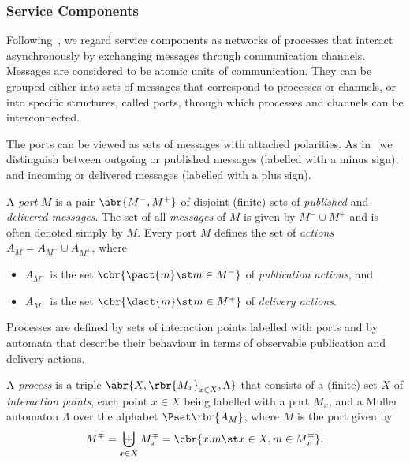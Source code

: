 \documentclass{LMCS}
\begin{document}
\subsubsection*{Service Components}

Following~\cite{Fiadeiro-Lopes:An-interface-theory-for-service-oriented-design-2013}, we regard service components as networks of processes that interact asynchronously by exchanging messages through communication channels.
Messages are considered to be atomic units of communication.  They can be grouped either into sets of messages that correspond to processes or channels, or into specific structures, called ports, through which processes and channels can be interconnected.

The ports can be viewed as sets of messages with attached polarities.  As in~\cite{Brand-Zafiropulo:Communicating-finite-state-machines-1983,Benatallah-Casati-Toumani:Representing-analysing-and-managing-Web-service-protocols-2006} we distinguish between outgoing or published messages (labelled with a minus sign), and incoming or delivered messages (labelled with a plus sign).

\begin{defi}[Port]
  A \emph{port} \(M\) is a pair \(\abr{M^{-}, M^{+}}\) of disjoint (finite) sets of \emph{published} and \emph{delivered messages}.
  The set of all \emph{messages} of \(M\) is given by \(M^{-} \cup M^{+}\) and is often denoted simply by \(M\).
  Every port \(M\) defines the set of \emph{actions} \(A_{M} = A_{M^{-}} \cup A_{M^{+}}\), where
  \begin{itemize}
    
  \item \(A_{M^{-}}\) is the set \(\cbr{\pact{m} \st m \in M^{-}}\) of \emph{publication actions}, and
    
  \item \(A_{M^{+}}\) is the set \(\cbr{\dact{m} \st m \in M^{+}}\) of \emph{delivery actions}.
    
  \end{itemize}
\end{defi}

Processes are defined by sets of interaction points labelled with ports and by automata that describe their behaviour in terms of observable publication and delivery actions.

\begin{defi}[Process]
  \label{definition:process}
  A \emph{process} is a triple \(\abr{X, \rbr{M_{x}}_{x \in X}, \Lambda}\) that consists of a (finite) set \(X\) of \emph{interaction points}, each point \(x \in X\) being labelled with a port \(M_{x}\), and a Muller automaton \(\Lambda\) over the alphabet \(\Pset\rbr{A_{M}}\), where \(M\) is the port given by
  \[
  M^{\mp} = \biguplus_{x \in X} M_{x}^{\mp} = \cbr{x.m \st x \in X, m \in M_{x}^{\mp}}.
  \]
\end{defi}
\end{document}
